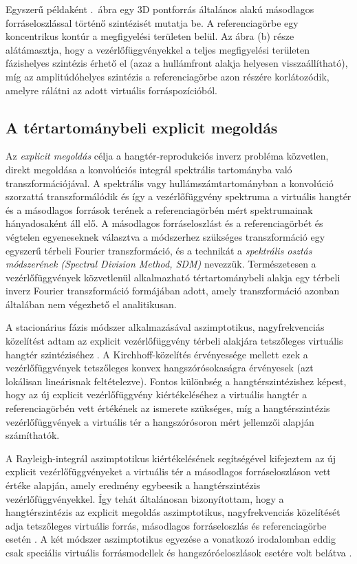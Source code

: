 \documentclass[10pt,twoside]{article}
\theoremstyle{thesisgroupstyle}
\theoremstyle{indented}
\begin{document}
Egyszerű példaként .\ ábra egy 3D pontforrás általános alakú másodlagos forráseloszlással történő szintézisét mutatja be.
A referenciagörbe egy koncentrikus kontúr a megfigyelési területen belül.
Az ábra (b) része alátámasztja, hogy a vezérlőfüggvényekkel a teljes megfigyelési területen fázishelyes szintézis érhető el (azaz a hullámfront alakja helyesen visszaállítható), míg az amplitúdóhelyes szintézis a referenciagörbe azon részére korlátozódik, amelyre rálátni az adott virtuális forráspozícióból.

\subsection{A tértartománybeli explicit megoldás}

Az \emph{explicit megoldás} célja a hangtér-reprodukciós inverz probléma közvetlen, direkt megoldása a konvolúciós integrál spektrális tartományba való transzformációjával.
A spektrális vagy hullámszámtartományban a konvolúció szorzattá transzformálódik és így a vezérlőfüggvény spektruma a virtuális hangtér és a másodlagos források terének a referenciagörbén mért spektrumainak hányadosaként áll elő.
A másodlagos forráseloszlást és a referenciagörbét és végtelen egyeneseknek választva a módszerhez szükséges transzformáció egy egyszerű térbeli Fourier transzformáció, és a technikát a \emph{spektrális osztás módszerének (Spectral Division Method, SDM)} nevezzük.
Természetesen a vezérlőfüggvények közvetlenül alkalmazható tértartománybeli alakja egy térbeli inverz Fourier transzformáció formájában adott, amely transzformáció azonban általában nem végezhető el analitikusan.

A stacionárius fázis módszer alkalmazásával aszimptotikus, nagyfrekvenciás közelítést adtam az explicit vezérlőfüggvény térbeli alakjára tetszőleges virtuális hangtér szintéziséhez \cite{Firtha2017:daga_booklet}.
A Kirchhoff-közelítés érvényessége mellett ezek a vezérlőfüggvények tetszőleges konvex hangszórósokaságra érvényesek (azt lokálisan lineárisnak feltételezve).
Fontos különbség a hangtérszintézishez képest, hogy az új explicit vezérlőfüggvény kiértékeléséhez a virtuális hangtér a referenciagörbén vett értékének az ismerete szükséges, míg a hangtérszintézis vezérlőfüggvények a virtuális tér a hangszórósoron mért jellemzői alapján számíthatók.

A Rayleigh-integrál aszimptotikus kiértékelésének segítségével kifejeztem az új explicit vezérlőfüggvényeket a virtuális tér a másodlagos forráseloszláson vett értéke alapján, amely eredmény egybeesik a hangtérszintézis vezérlőfüggvényekkel.
Így tehát általánosan bizonyítottam, hogy a hangtérszintézis az explicit megoldás aszimptotikus, nagyfrekvenciás közelítését adja tetszőleges virtuális forrás, másodlagos forráseloszlás és referenciagörbe esetén \cite{Firtha2018:WFS_vs_SDM_booklet}.
A két módszer aszimptotikus egyezése a vonatkozó irodalomban eddig csak speciális virtuális forrásmodellek és hangszóróeloszlások esetére volt belátva \cite{Schultz2019:HOA_vs_WFS_booklet}.
\end{document}
